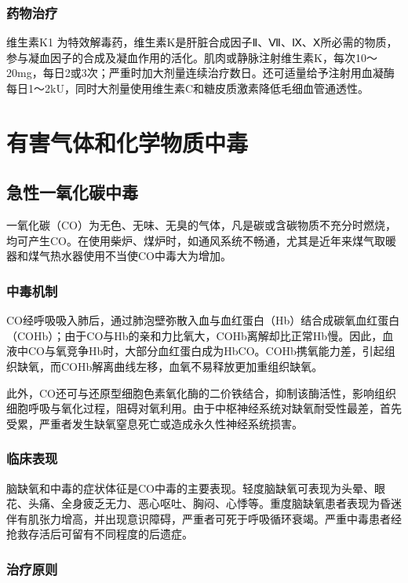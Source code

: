 \subsubsection{药物治疗}

维生素K{1}
为特效解毒药，维生素K是肝脏合成因子Ⅱ、Ⅶ、Ⅸ、Ⅹ所必需的物质，参与凝血因子的合成及凝血作用的活化。肌肉或静脉注射维生素K，每次10～20mg，每日2或3次；严重时加大剂量连续治疗数日。还可适量给予注射用血凝酶每日1～2kU，同时大剂量使用维生素C和糖皮质激素降低毛细血管通透性。

\section{有害气体和化学物质中毒}

\subsection{急性一氧化碳中毒}

一氧化碳（CO）为无色、无味、无臭的气体，凡是碳或含碳物质不充分时燃烧，均可产生CO。在使用柴炉、煤炉时，如通风系统不畅通，尤其是近年来煤气取暖器和煤气热水器使用不当使CO中毒大为增加。

\subsubsection{中毒机制}

CO经呼吸吸入肺后，通过肺泡壁弥散入血与血红蛋白（Hb）结合成碳氧血红蛋白（COHb）；由于CO与Hb的亲和力比氧大，COHb离解却比正常Hb慢。因此，血液中CO与氧竞争Hb时，大部分血红蛋白成为HbCO。COHb携氧能力差，引起组织缺氧，而COHb解离曲线左移，血氧不易释放更加重组织缺氧。

此外，CO还可与还原型细胞色素氧化酶的二价铁结合，抑制该酶活性，影响组织细胞呼吸与氧化过程，阻碍对氧利用。由于中枢神经系统对缺氧耐受性最差，首先受累，严重者发生缺氧窒息死亡或造成永久性神经系统损害。

\subsubsection{临床表现}

脑缺氧和中毒的症状体征是CO中毒的主要表现。轻度脑缺氧可表现为头晕、眼花、头痛、全身疲乏无力、恶心呕吐、胸闷、心悸等。重度脑缺氧患者表现为昏迷伴有肌张力增高，并出现意识障碍，严重者可死于呼吸循环衰竭。严重中毒患者经抢救存活后可留有不同程度的后遗症。

\subsubsection{治疗原则}

